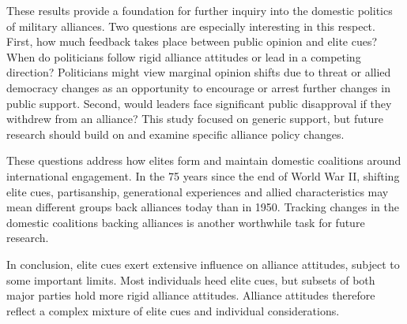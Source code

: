 \documentclass[12pt]{article}
\begin{document}
These results provide a foundation for further inquiry into the domestic politics of military alliances. 
Two questions are especially interesting in this respect.
First, how much feedback takes place between public opinion and elite cues? 
When do politicians follow rigid alliance attitudes or lead in a competing direction? 
Politicians might view marginal opinion shifts due to threat or allied democracy changes as an opportunity to encourage or arrest further changes in public support.
Second, would leaders face significant public disapproval if they withdrew from an alliance? 
This study focused on generic support, but future research should build on \citet{TomzWeeks2021} and examine specific alliance policy changes. 


These questions address how elites form and maintain domestic coalitions around international engagement. 
In the 75 years since the end of World War II, shifting elite cues, partisanship, generational experiences and allied characteristics may mean different groups back alliances today than in 1950. 
Tracking changes in the domestic coalitions backing alliances is another worthwhile task for future research.


In conclusion, elite cues exert extensive influence on alliance attitudes, subject to some important limits.
Most individuals heed elite cues, but subsets of both major parties hold more rigid alliance attitudes. 
Alliance attitudes therefore reflect a complex mixture of elite cues and individual considerations. 



\newpage

 
 
\end{document}
